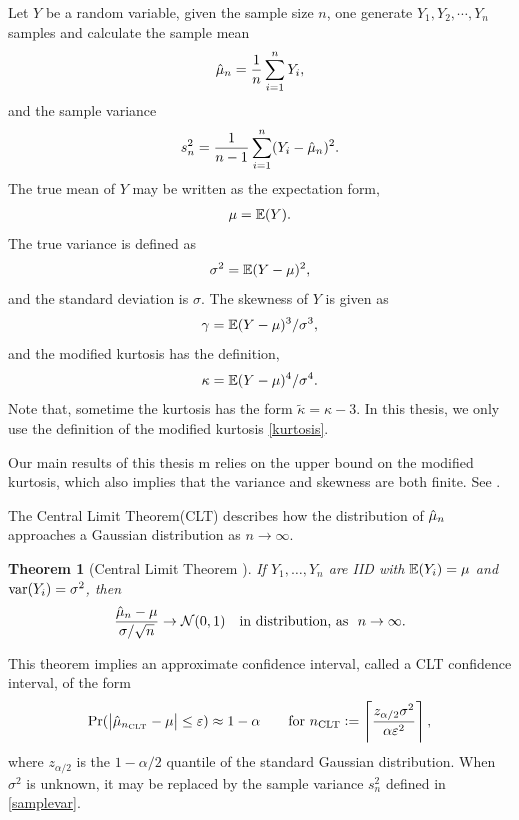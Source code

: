 \documentclass{iitthesis}
\newtheorem{theorem}{Theorem}[section]
\theoremstyle{definition}
\begin{document}
Let $Y$ be a random variable, given the sample size $n$, one generate $Y_1, Y_2, \cdots, Y_n$ samples and calculate the sample mean 
\begin{align}\label{samplemean}
\hat{\mu}_n = \frac1n\sum_{i=1}^n Y_i,
\end{align}
and the sample variance
\begin{align}\label{samplevar}
s^2_n = \frac{1}{n-1}\sum_{i=1}^n (Y_i-\hat{\mu}_n)^2.
\end{align}
The true mean of $Y$ may be written as the expectation form,
\begin{align}\label{truemean}
\mu = \mathbb{E}(Y).
\end{align}
The true variance is defined as
\begin{align}\label{truevar}
\sigma^2 = \mathbb{E}(Y-\mu)^2,
\end{align}
and the standard deviation is $\sigma$. The skewness of $Y$ is given as 
\begin{align}\label{screwness}
\gamma = \mathbb{E}(Y-\mu)^3/\sigma^3,
\end{align}
and the modified kurtosis has the definition,
\begin{align}\label{kurtosis}
\kappa = \mathbb{E}(Y-\mu)^4/\sigma^4.
\end{align}
Note that, sometime the kurtosis has the form $\tilde{\kappa} = \kappa-3$. In this thesis, we only use the definition of the modified kurtosis \eqref{kurtosis}.

Our main results of this thesis m  relies on the upper bound on the modified kurtosis, which also implies that the variance and skewness are both finite. See \cite{HJLO12}.


The Central Limit Theorem(CLT) describes how the distribution of $\hat{\mu}_n$ approaches a Gaussian distribution as $n \to \infty$.
\begin{theorem}[Central Limit Theorem {\cite[Theorem 21.1]{JP04}}] \label{clt} 
If $Y_1, \ldots, Y_n$ are IID with $\mathbb{E}(Y_i)=\mu$ and $\operatorname{var}(Y_i) = \sigma^2$, then
$$
\frac{\hmu_n-\mu}{\sigma/\sqrt{n}} \to \dnorm(0,1) \quad \text{in distribution, as} \ \ n\to\infty.
$$
\end{theorem}
This theorem implies an approximate confidence interval, called a CLT confidence interval, of the form
\[
\Pr(\left \lvert \hat{\mu}_{n_{\text{CLT}}}-\mu \right \rvert \le \varepsilon) \approx 1- \alpha \qquad \text{for } n_{\text{CLT}} := \left \lceil \frac{z_{\alpha/2}\sigma^2}{\alpha \varepsilon^2} \right \rceil,
\]
where $z_{\alpha/2}$ is the $1-\alpha/2$ quantile of the standard Gaussian distribution.  When $\sigma^2$ is unknown, it may be replaced by the sample variance $s_n^2$ defined in \eqref{samplevar}.
\end{document}

